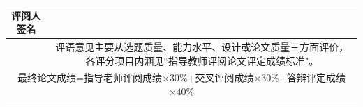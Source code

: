 {\begin{tabular}{|c|c|c|c|c|c|c|}
		\multicolumn{2}{|c|}{评阅人签名}   & \multicolumn{5}{c|}{ } \\\hline
		\multicolumn{2}{|c|}{\raisebox{-1.8ex}{备注}}     & \multicolumn{5}{p{11.8cm}|}{评语意见主要从选题质量、能力水平、设计或论文质量三方面评价，
			各评分项目内涵见``指导教师评阅论文评定成绩标准"。} \\\hline
		\multicolumn{7}{c}{最终论文成绩=指导老师评阅成绩$\times 30\%$+交叉评阅成绩$\times 30\%$+答辩评定成绩$\times 40\%$}\\
	\end{tabular}}
